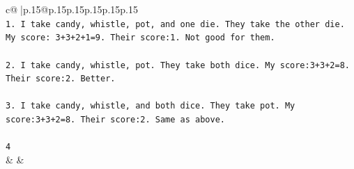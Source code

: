 \documentclass{article}
\begin{document}
{\begin{supertabular}{c@{$\;$}|p{.15\linewidth}@{}p{.15\linewidth}p{.15\linewidth}p{.15\linewidth}p{.15\linewidth}p{.15\linewidth}}
{{{\\ 
\texttt{1. I take candy, whistle, pot, and one die. They take the other die. My score: 3+3+2+1=9. Their score:1. Not good for them.} \\
\\ 
\texttt{2. I take candy, whistle, pot. They take both dice. My score:3+3+2=8. Their score:2. Better.} \\
\\ 
\texttt{3. I take candy, whistle, and both dice. They take pot. My score:3+3+2=8. Their score:2. Same as above.} \\
\\ 
\texttt{4} \\
            }
        }
    }
    & & \\ \\


\end{supertabular}}
\end{document}
